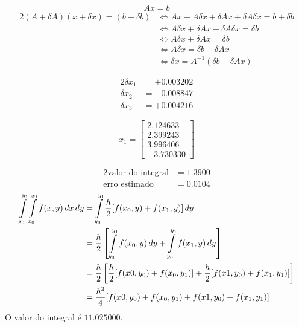 \setcounter{chapter}{16}
{
\renewcommand{\thesubsection}{\thesection\alph{subsection}}
\begin{equation*}
	Ax=b
\end{equation*}
\begin{alignat*}{2}
	(A+\delta A)(x+\delta x) = (b+\delta b)
	&\iff Ax+A\delta x + \delta A x + \delta A \delta x = b + \delta b \\
	&\iff A\delta x + \delta A x + \delta A \delta x = \delta b \\
	&\iff A\delta x + \delta A x = \delta b \\
	&\iff A\delta x = \delta b - \delta A x \\
	&\iff \delta x = A^{-1}(\delta b - \delta A x)
\end{alignat*}

\begin{alignat*}{2}
		\delta x_1 &= +0.003202\\
		\delta x_2 &= -0.008847\\
		\delta x_3 &= +0.004216
\end{alignat*}

%
\begin{equation*}
	x_1 =
	\begin{bmatrix}
		2.124633 \\
		2.399243 \\
		3.996406 \\
		-3.730330
	\end{bmatrix}
\end{equation*}

%
\begin{alignat*}{2}
	\text{valor do integral} &= 1.3900\\
	\text{erro estimado}     &= 0.0104
\end{alignat*}
\begin{alignat*}{2}
	\int\displaylimits_{y_0}^{y_1}{\int\displaylimits_{x_0}^{x_1}{f(x,y)\,dx}\,dy}
	&= \int\displaylimits_{y_0}^{y_1}{\frac{h}{2}[f(x_0,y)+f(x_1,y)]\,dy}\\
	&= \frac{h}{2}\left[\int\displaylimits_{y_0}^{y_1}{f(x_0,y)\,dy}+\int\displaylimits_{y_0}^{y_1}{f(x_1,y)\,dy}\right]\\
	&= \frac{h}{2}\left[\frac{h}{2}[f(x0,y_0)+f(x_0,y_1)]+\frac{h}{2}[f(x1,y_0)+f(x_1,y_1)]\right]\\
	&= \frac{h^2}{4}[f(x0,y_0)+f(x_0,y_1)+f(x1,y_0)+f(x_1,y_1)]
\end{alignat*}
%
O valor do integral é $11.025000$.

}
